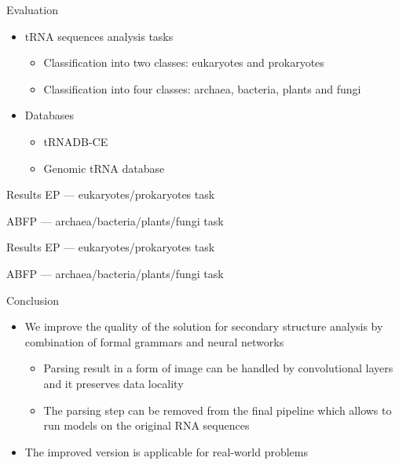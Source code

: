 \documentclass[xcolor=table]{beamer}
\begin{document}
\begin{frame}{Evaluation}
\begin{itemize}
    \item tRNA sequences analysis tasks
    \begin{itemize}
        \item Classification into two classes: eukaryotes and prokaryotes
        \item Classification into four classes: archaea, bacteria, plants and fungi
    \end{itemize}
    \item Databases
    \begin{itemize}
        \item tRNADB-CE
        \item Genomic tRNA database
    \end{itemize}
\end{itemize}
\end{frame}

\begin{frame}{Results}
EP --- eukaryotes/prokaryotes task

ABFP --- archaea/bacteria/plants/fungi task


\end{frame}

\begin{frame}{Results}
EP --- eukaryotes/prokaryotes task

ABFP --- archaea/bacteria/plants/fungi task


\end{frame}

\begin{frame}{Conclusion}
\begin{itemize}
    \item We improve the quality of the solution for secondary structure analysis by combination of formal grammars and neural networks 
    \begin{itemize}
        \item Parsing result in a form of image can be handled by convolutional layers and it preserves data locality
        \item The parsing step can be removed from the final pipeline which allows to run models on the original RNA sequences        
    \end{itemize}
    \item The improved version is applicable for real-world problems
\end{itemize}
\end{frame}
\end{document}
